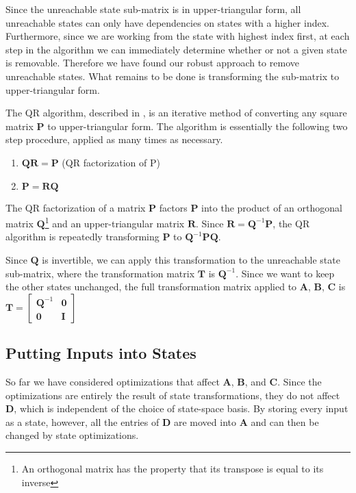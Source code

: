     Since the unreachable state sub-matrix is in upper-triangular
form, all unreachable states can only have dependencies on states
with a higher index. Furthermore, since we are working from the
state with highest index first, at each step in the algorithm we
can immediately determine whether or not a given state is
removable. Therefore we have found our robust approach to remove
unreachable states. What remains to be done is transforming the
sub-matrix to upper-triangular form.

    The QR algorithm, described in \cite{Trefethen}, is an iterative method of
converting any square matrix $\mathbf{P}$ to upper-triangular
form. The algorithm is essentially the following two step
procedure, applied as many times as necessary.
\begin{enumerate}
\item $\mathbf{Q} \mathbf{R} = \mathbf{P}$   (QR factorization of
P)

\item $\mathbf{P} = \mathbf{R} \mathbf{Q}$
\end{enumerate}

    The QR factorization of a matrix $\mathbf{P}$ factors
$\mathbf{P}$ into the product of an orthogonal matrix
$\mathbf{Q}$\footnote{An orthogonal matrix has the property that
its transpose is equal to its inverse} and an upper-triangular
matrix $\mathbf{R}$. Since $\mathbf{R} = \mathbf{Q}^{-1}
\mathbf{P}$, the QR algorithm is repeatedly transforming
$\mathbf{P}$ to $\mathbf{Q}^{-1} \mathbf{P} \mathbf{Q}$.

    Since $\mathbf{Q}$ is invertible, we can apply this
transformation to the unreachable state sub-matrix, where the
transformation matrix $\mathbf{T}$ is $\mathbf{Q}^{-1}$. Since we
want to keep the other states unchanged, the full transformation
matrix applied to $\mathbf{A}$, $\mathbf{B}$, $\mathbf{C}$ is
$\mathbf{T} = \left [ \begin{array} {cc} \mathbf{Q}^{-1} &
\mathbf{0} \\ \mathbf{0} & \mathbf{I} \end{array} \right ]$

\subsection{Putting Inputs into States}

    So far we have considered optimizations that affect $\mathbf{A}$,
$\mathbf{B}$, and $\mathbf{C}$. Since the optimizations are
entirely the result of state transformations, they do not affect
$\mathbf{D}$, which is independent of the choice of state-space
basis. By storing every input as a state, however, all the entries
of $\mathbf{D}$ are moved into $\mathbf{A}$ and can then be
changed by state optimizations.

